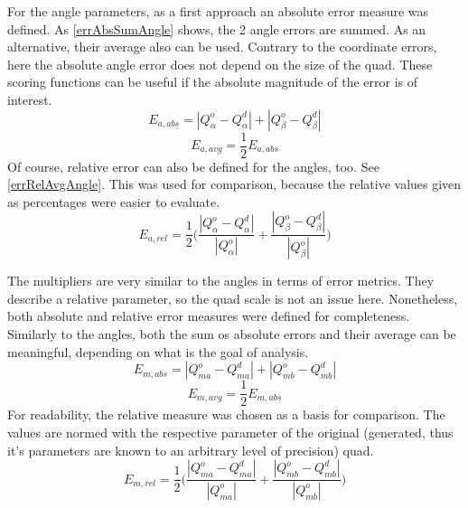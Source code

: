 For the angle parameters, as a first approach an absolute error measure was defined.
As \eqref{errAbsSumAngle} shows, the 2 angle errors are summed.
As an alternative, their average also can be used.
Contrary to the coordinate errors, here the absolute angle error does not depend on the size of the quad.
These scoring functions can be useful if the absolute magnitude of the error is of interest.
\begin{equation}
	E_{a,abs} = |Q_\alpha^o - Q_\alpha^d| + |Q_\beta^o - Q_\beta^d|
	\label{eq:errAbsSumAngle}
\end{equation}
\begin{equation}
	E_{a,avg} = \frac{1}{2} E_{a,abs}
	\label{eq:errAbsAvgAngle}
\end{equation}
Of course, relative error can also be defined for the angles, too.
See \eqref{errRelAvgAngle}.
This was used for comparison, because the relative values given as percentages were easier to evaluate.
\begin{equation}
	E_{a,rel} = \frac{1}{2}\Bigg(\frac{|Q_\alpha^o - Q_\alpha^d|}{|Q_\alpha^o|} + \frac{|Q_\beta^o - Q_\beta^d|}{|Q_\beta^o|}\Bigg)
	\label{eq:errRelAvgAngle}
\end{equation}

The multipliers are very similar to the angles in terms of error metrics.
They describe a relative parameter, so the quad scale is not an issue here.
Nonetheless, both absolute and relative error measures were defined for completeness.
Similarly to the angles, both the sum os absolute errors and their average can be meaningful, depending on what is the goal of analysis.
\begin{equation}
	E_{m,abs} = |Q_{ma}^o - Q_{ma}^d| + |Q_{mb}^o - Q_{mb}^d|
	\label{eq:errAbsSumMul}
\end{equation}
\begin{equation}
	E_{m,avg} = \frac{1}{2} E_{m,abs}
	\label{eq:errAbsAvgMul}
\end{equation}
For readability, the relative measure was chosen as a basis for comparison.
The values are normed with the respective parameter of the original (generated, thus it's parameters are known to an arbitrary level of precision) quad.
\begin{equation}
	E_{m,rel} = \frac{1}{2}\Bigg(\frac{|Q_{ma}^o - Q_{ma}^d|}{|Q_{ma}^o|} + \frac{|Q_{mb}^o - Q_{mb}^d|}{|Q_{mb}^o|}\Bigg)
	\label{eq:errRelAvgMul}
\end{equation}


